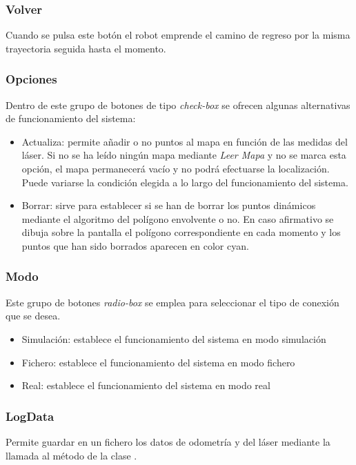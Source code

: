 \subsubsection{Volver}

\noindent
Cuando se pulsa este botón el robot emprende el camino de regreso por la misma trayectoria seguida hasta el momento.

\subsubsection{Opciones}
Dentro de este grupo de botones de tipo \emph{check-box} se ofrecen algunas alternativas de funcionamiento del sistema:
\begin{itemize}
  \item Actualiza: permite añadir o no puntos al mapa en función de las medidas del láser. Si no se ha leído ningún mapa mediante \emph{Leer Mapa} y no se marca esta opción, el mapa permanecerá vacío y no podrá efectuarse la localización. Puede variarse la condición elegida a lo largo del funcionamiento del sistema.
  \item Borrar: sirve para establecer si se han de borrar los puntos dinámicos mediante el algoritmo del polígono envolvente o no. En caso afirmativo se dibuja sobre la pantalla el polígono correspondiente en cada momento y los puntos que han sido borrados aparecen en color cyan.
\end{itemize}

\subsubsection{Modo}
Este grupo de botones \emph{radio-box} se emplea para seleccionar el tipo de conexión que se desea.
\begin{itemize}
  \item Simulación: establece el funcionamiento del sistema en modo simulación
  \item Fichero: establece el funcionamiento del sistema en modo fichero
  \item Real: establece el funcionamiento del sistema en modo real
\end{itemize}

\subsubsection{LogData}
Permite guardar en un fichero los datos de odometría y del láser mediante la llamada al método  de la clase .

